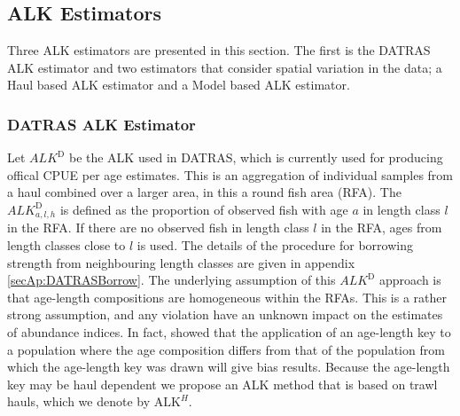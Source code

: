 \documentclass[a4paper 12pt]{article}
\numberwithin{equation}{section}
\begin{document}





\subsection{ALK Estimators}

Three ALK estimators are presented in this section. The first is the DATRAS ALK estimator and two estimators that consider spatial variation in the data; a Haul based ALK estimator and a Model based ALK estimator.

\subsubsection{DATRAS ALK Estimator }
\label{sec:datrasalkestimator}
Let $ALK^{\text{D}}$ be the ALK used in DATRAS, which is currently used for producing offical CPUE per age estimates. This is an aggregation of individual samples from a haul combined over a larger area, in this a round fish area (RFA). The $ALK^{\text{D}}_{a,l,h}$ is defined as the proportion of observed fish with age $a$ in length class $l$ in the RFA. If there are no observed fish in length class $l$ in the RFA, ages from length classes close to $l$ is used. The details of the procedure for borrowing strength from neighbouring length classes are given in appendix \ref{secAp:DATRASBorrow}. The underlying assumption of this  $ALK^{\text{D}}$ approach is that age-length compositions are homogeneous within the RFAs. This is a rather strong assumption, and any violation have an unknown impact on the estimates of abundance indices. In fact, \citet{kimura1977statistical} showed that the application of an age-length key  to a population where the age composition differs from that of the population from which the age-length key was drawn will give bias results. Because the age-length key may be haul dependent we propose an ALK method that is based on trawl hauls, which we denote by $\mathrm{ALK}^{H}$. 
\end{document}
